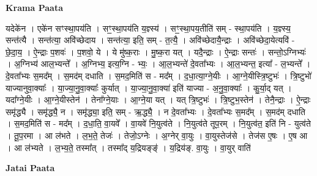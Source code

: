 \documentclass[17pt]{extarticle}
\begin{document}
\textbf{Krama Paata} \newline

यदेके॑न । एके॑न सꣳस्था॒पय॑ति । सꣳ॒॒स्था॒पय॑ति य॒ज्ञ्स्य॑ । सꣳ॒॒स्था॒पय॒तीति॑ सम् - स्था॒पय॑ति । य॒ज्ञ्स्य॒ सन्त॑त्यै । सन्त॑त्या॒ अवि॑च्छेदाय । सन्त॑त्या॒ इति॒ सम् - त॒त्यै॒ । अवि॑च्छेदायै॒न्द्राः । अवि॑च्छेदा॒येत्यवि॑ - छे॒दा॒य॒ । ऐ॒न्द्राः प॒शवः॑ । प॒शवो॒ ये । 
ये मु॑ष्क॒राः । मु॒ष्क॒रा यत् । यदै॒न्द्राः । ऐ॒न्द्राः सन्तः॑ । सन्तो॒ऽग्निभ्यः॑ । अ॒ग्निभ्य॑ आल॒भ्यन्ते᳚ । अ॒ग्निभ्य॒ इत्य॒ग्नि - भ्यः॒ । आ॒ल॒भ्यन्ते॑ दे॒वता᳚भ्यः । आ॒ल॒भ्यन्त॒ इत्या᳚ - ल॒भ्यन्ते᳚ । दे॒वता᳚भ्यः स॒मद᳚म् । स॒मद॑म् दधाति । स॒मद॒मिति॑ स - मद᳚म् । द॒धा॒त्या॒ग्ने॒यीः । आ॒ग्ने॒यीस्त्रि॒ष्टुभः॑ । त्रि॒ष्टुभो॑ याज्यानुवा॒क्याः᳚ । या॒ज्या॒नु॒वा॒क्याः᳚ कुर्यात् । या॒ज्या॒नु॒वा॒क्या॑ इति॑ याज्या - अ॒नु॒वा॒क्याः᳚ । कु॒र्या॒द् यत् । यदा᳚ग्ने॒यीः । आ॒ग्ने॒यीस्तेन॑ । तेना᳚ग्ने॒याः । आ॒ग्ने॒या यत् । यत् त्रि॒ष्टुभः॑ । त्रि॒ष्टुभ॒स्तेन॑ । तेनै॒न्द्राः । ऐ॒न्द्राः समृ॑द्ध्यै । समृ॑द्ध्यै॒ न । समृ॑द्ध्या॒ इति॒ सम् - ऋ॒द्ध्यै॒ । न दे॒वता᳚भ्यः । दे॒वता᳚भ्यः स॒मद᳚म् । स॒मद॑म् दधाति । स॒मद॒मिति॑ स - मद᳚म् । द॒धा॒ति॒ वा॒यवे᳚ । वा॒यवे॑ नि॒युत्व॑ते । नि॒युत्व॑ते तूप॒रम् । नि॒युत्व॑त॒ इति॑ नि - युत्व॑ते । तू॒प॒रमा । आ ल॑भते । ल॒भ॒ते॒ तेजः॑ । तेजो॒ऽग्नेः । अ॒ग्नेर् वा॒युः । वा॒युस्तेज॑से । तेज॑स ए॒षः । ए॒ष आ । आ ल॑भ्यते । ल॒भ्य॒ते॒ तस्मा᳚त् । तस्मा᳚द् य॒द्रियङ्ङ्॑ । य॒द्रिय॑ङ्. वा॒युः । वा॒युर् वाति॑ \newline

\textbf{Jatai Paata} \newline
\end{document}
